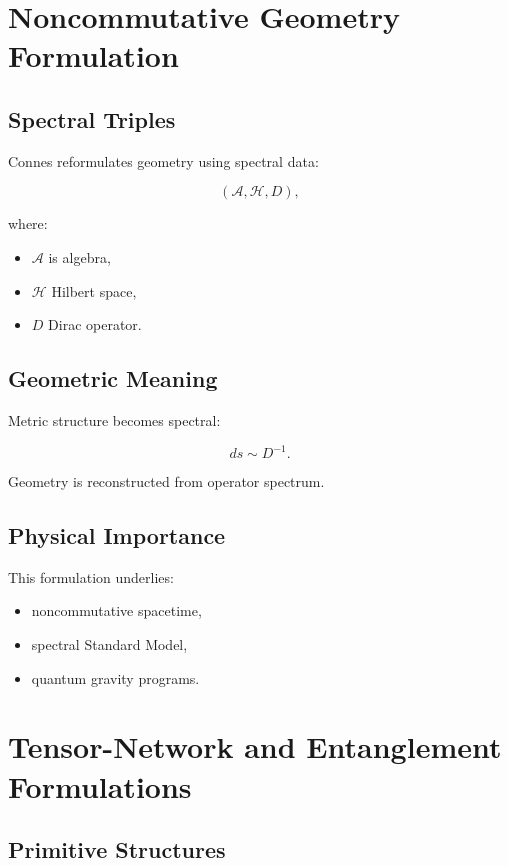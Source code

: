\documentclass[11pt]{article}
\begin{document}
\section{Noncommutative Geometry Formulation}

\subsection{Spectral Triples}

Connes reformulates geometry using spectral data:

\[
(\mathcal A,\mathcal H,D),
\]

where:

\begin{itemize}
\item $\mathcal A$ is algebra,
\item $\mathcal H$ Hilbert space,
\item $D$ Dirac operator.
\end{itemize}

\subsection{Geometric Meaning}

Metric structure becomes spectral:

\[
ds
\sim
D^{-1}.
\]

Geometry is reconstructed from operator spectrum.

\subsection{Physical Importance}

This formulation underlies:

\begin{itemize}
\item noncommutative spacetime,
\item spectral Standard Model,
\item quantum gravity programs.
\end{itemize}

\section{Tensor-Network and Entanglement Formulations}

\subsection{Primitive Structures}
\end{document}
